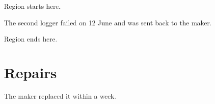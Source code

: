 \documentclass[11pt]{article}
\begin{document}
Region starts here.

The second logger failed on 12 June and was sent back to the maker.

Region ends here.

\section{Repairs}
The maker replaced it within a week.
\end{document}
